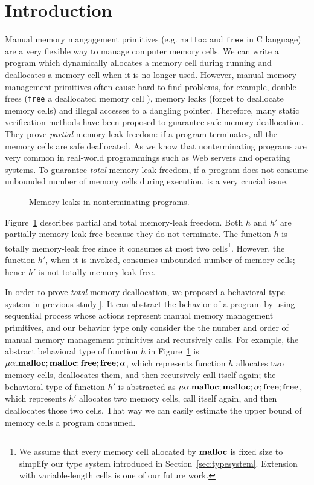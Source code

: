 \section{Introduction}
\label{sec:introduction}
Manual memory mangagement primitives (e.g. \(\texttt{malloc}\) and
\(\texttt{free}\) in C language) are a very flexible way to manage
computer memory cells.  We can write a program which dynamically
allocates a memory cell during running and deallocates a memory cell
when it is no longer used. However, manual memory management
primitives often cause hard-to-find problems, for example, double
frees (\texttt{free} a deallocated memory cell ), memory leaks (forget
to deallocate memory cells) and illegal accesses to a dangling
pointer. Therefore, many static verification methods have been
proposed to guarantee safe memory deallocation. They prove
\emph{partial} memory-leak freedom: if a program terminates, all the
memory cells are safe deallocated. As we know that nonterminating
programs are very common in real-world programmings such as Web
servers and operating systems. To guarantee \emph{total} memory-leak
freedom, if a program does not consume unbounded number of memory
cells during execution, is a very crucial issue.

\begin{exmp}\label{ex:ex1}
\begin{figure}[h]
\caption{Memory leaks in nonterminating programs.}
\label{ex:np}
\end{figure}
Figure~\ref{ex:np} describes partial and total memory-leak freedom.
Both \(h\) and \(h'\) are partially memory-leak free because they do
not terminate.  The function \(h\) is totally memory-leak free since
it consumes at most two cells\footnote{We assume that every memory
  cell allocated by \(\mathbf{malloc}\) is fixed size to simplify our type
  system introduced in Section~\ref{sec:typesystem}.  Extension with
  variable-length cells is one of our future work.}.  However, the
function \(h'\), when it is invoked, consumes unbounded number of
memory cells; hence \(h'\) is not totally memory-leak free.
\end{exmp}

In order to prove \emph{total} memory deallocation, we proposed a
behavioral type system in previous study[]. It can abstract the
behavior of a program by using sequential process whose actions
represent manual memory management primitives, and our behavior type
only consider the the number and order of manual memory management
primitives and recursively calls. For example, the abstract behavioral
type of function \(h\) in Figure~\ref{ex:np} is
\(\mu\alpha.\mathbf{malloc};\mathbf{malloc};\mathbf{free};\mathbf{free};\alpha\), which represents
function \(h\) allocates two memory cells, deallocates them, and then
recursively call itself again; the behavioral type of function \(h'\)
is abstracted as \(\mu\alpha.\mathbf{malloc};\mathbf{malloc};\alpha;\mathbf{free};\mathbf{free}\),
which represents \(h'\) allocates two memory cells, call itself again,
and then deallocates those two cells. That way we can easily estimate
the upper bound of memory cells a program consumed.

